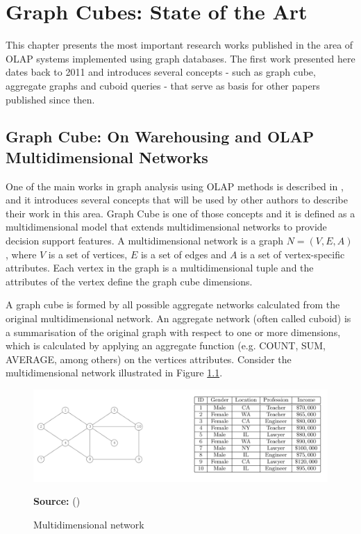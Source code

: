 \chapter{Graph Cubes: State of the Art}

This chapter presents the most important research works published in the area of OLAP systems implemented using graph databases. The first work presented here dates back to 2011 and introduces several concepts - such as graph cube, aggregate graphs and cuboid queries - that serve as basis for other papers published since then.

\section{Graph Cube: On Warehousing and OLAP Multidimensional Networks}

One of the main works in graph analysis using OLAP methods is described in \cite{Zhao2011}, and it  introduces several concepts that will be used by other authors to describe their work in this area. Graph Cube is one of those concepts and it is defined as a multidimensional model that extends multidimensional networks to provide decision support features. A multidimensional network is a graph $N=(V,E,A)$, where $V$ is a set of vertices, $E$ is a set of edges and $A$ is a set of vertex-specific attributes. Each vertex in the graph is a multidimensional tuple and the attributes of the vertex define the graph cube dimensions.

A graph cube is formed by all possible aggregate networks calculated from the original multidimensional network. An aggregate network (often called cuboid) is a summarisation of the original graph with respect to one or more dimensions, which is calculated by applying an aggregate function (e.g. COUNT, SUM, AVERAGE, among others) on the vertices attributes. Consider the multidimensional network illustrated in Figure \ref{fig:figure12}.

\begin{figure}[ht]
\centering
\caption{Multidimensional network}
\label{fig:figure12}
\includegraphics[width=1\textwidth]{images/multidimensional_graph.png}
\par\medskip\ABNTEXfontereduzida\selectfont\textbf{Source:} \citeauthor{Zhao2011} (\citeyear{Zhao2011}) \par\medskip
\end{figure}


